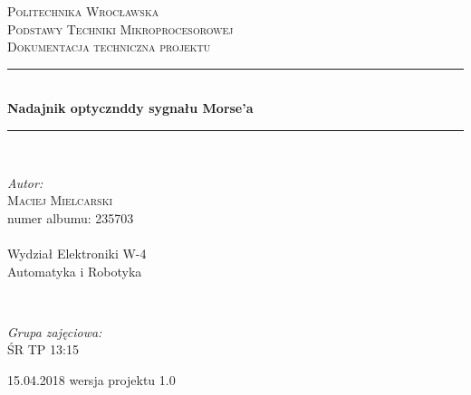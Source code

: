\documentclass{article}
\begin{document}
\begin{titlepage} 
	\newcommand{\HRule}{\rule{\linewidth}{0.5mm}} 
	
	\center 
	
	
	\textsc{\LARGE Politechnika Wrocławska}\\[1.5cm] %
	
	\textsc{\Large Podstawy Techniki Mikroprocesorowej}\\[0.5cm] %
	
	\textsc{\large Dokumentacja techniczna projektu}\\[0.5cm] %
	
	
	\HRule\\[0.4cm]
	
	{\huge\bfseries Nadajnik optycznddy sygnału Morse'a}\\[0.4cm] %
	
	\HRule\\[1.5cm]
	
	
	\begin{minipage}{0.5\textwidth}
		\begin{flushleft}
			\large
			\textit{Autor:}\\
			\textsc{Maciej Mielcarski} \\numer albumu: 235703\\~\\Wydział Elektroniki W-4\\Automatyka i Robotyka 
		\end{flushleft}
	\end{minipage}
	~
	\begin{minipage}{0.4\textwidth}
		\begin{flushright}
			\large
			\textit{Grupa zajęciowa:}\\
			\textsc{ŚR TP 13:15} 
		\end{flushright}
	\end{minipage}

\vfill\vfill\vfill %
	
	{\large 15.04.2018 wersja projektu 1.0 } %
	
\end{titlepage}
\end{document}
